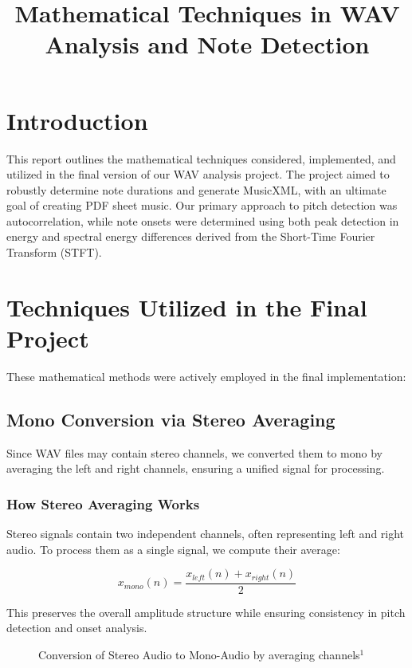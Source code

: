 \documentclass{article}
\title{Mathematical Techniques in WAV Analysis and Note Detection}
\author{}
\date{}
\begin{document}
\maketitle

\section{Introduction}
This report outlines the mathematical techniques considered, implemented, and utilized in the final version of our WAV analysis project. The project aimed to robustly determine note durations and generate MusicXML, with an ultimate goal of creating PDF sheet music. Our primary approach to pitch detection was autocorrelation, while note onsets were determined using both peak detection in energy and spectral energy differences derived from the Short-Time Fourier Transform (STFT).

\section{Techniques Utilized in the Final Project}
These mathematical methods were actively employed in the final implementation:

\subsection{Mono Conversion via Stereo Averaging}
Since WAV files may contain stereo channels, we converted them to mono by averaging the left and right channels, ensuring a unified signal for processing.

\subsubsection{How Stereo Averaging Works}
Stereo signals contain two independent channels, often representing left and right audio. To process them as a single signal, we compute their average:

\begin{equation}
x_{mono}(n) = \frac{x_{left}(n) + x_{right}(n)}{2}
\end{equation}

This preserves the overall amplitude structure while ensuring consistency in pitch detection and onset analysis.

\begin{figure}[h]
\caption{Conversion of Stereo Audio to Mono-Audio by averaging channels$^1$}
\end{figure}
\end{document}
